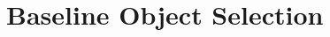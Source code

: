 \chapter[Baseline Object Selection][Baseline Object Selection]{Baseline Object Selection}
\label{app:baselineobjectselection}


